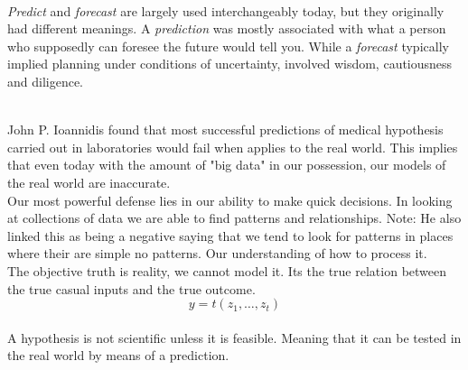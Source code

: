 \documentclass[12pt]{article}
\begin{document}

\begin{enumerate}

\\
\emph{Predict} and \emph{forecast} are largely used interchangeably today, but they originally had different meanings. A \emph{prediction} was mostly associated with what a person who supposedly can foresee the future would tell you. While a \emph{forecast} typically implied planning under conditions of uncertainty, involved wisdom, cautiousness and diligence.

\\
John P. Ioannidis  found that most successful predictions of medical hypothesis carried out in laboratories would fail when applies to the real world. This implies that even today with the amount of "big data" in our possession, our models of the real world are inaccurate. 
\\Our most powerful defense lies in our ability to make quick decisions. In looking at collections of data we are able to find patterns and relationships. Note: He also linked this as being a negative saying that we tend to look for patterns in places where their are simple no patterns.
Our understanding of how to process it. 
\\The objective truth is reality, we cannot model it. Its the true relation between the true casual inputs and the true outcome.
$$y = t(z_1, \ldots, z_t)  $$
\\A hypothesis is not scientific unless it is feasible. Meaning that it can be tested in the real world by means of a prediction. 


\end{enumerate}
\end{document}
